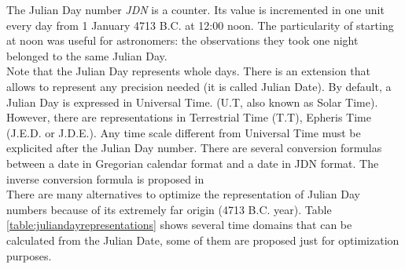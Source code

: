 The Julian Day number \emph{JDN} \cite{Dir96} is a counter. Its value is incremented in one unit every day from 1 January 4713 B.C. at 12:00 noon. The particularity of starting at noon was useful for astronomers: the observations they took one night belonged to the same Julian Day.\\
Note that the Julian Day represents whole days. There is an extension that allows to represent any precision needed (it is called Julian Date). By default, a Julian Day is expressed in Universal Time. (U.T, also known as Solar Time). However, there are representations in Terrestrial Time (T.T), Epheris Time (J.E.D. or J.D.E.). Any time scale different from Universal Time must be explicited after the Julian Day number. There are several conversion formulas~\cite{Usn}\cite{Wik}\cite{Lea} between a date in Gregorian calendar  format and a date in  JDN format. The inverse conversion formula is proposed in~\cite{Fliegel:1968:LEM:364096.364097}\\

There are many alternatives to optimize the representation of Julian Day numbers because of its extremely far origin (4713 B.C. year). Table \ref{table:juliandayrepresentations} shows several time domains that can be calculated from the Julian Date, some of them are proposed just for optimization purposes.


